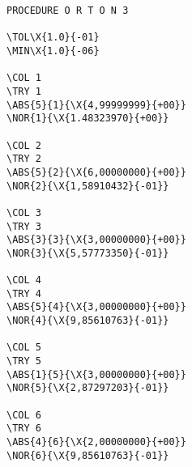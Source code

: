 


\small%
\begin{Verbatim}[commandchars=\\\{\},codes={\catcode`$=3\catcode`_=8}]
PROCEDURE O R T O N 3

\TOL\X{1.0}{-01}
\MIN\X{1.0}{-06}

\COL 1
\TRY 1
\ABS{5}{1}{\X{4,99999999}{+00}}
\NOR{1}{\X{1.48323970}{+00}}

\COL 2
\TRY 2
\ABS{5}{2}{\X{6,00000000}{+00}}
\NOR{2}{\X{1,58910432}{-01}}

\COL 3
\TRY 3
\ABS{3}{3}{\X{3,00000000}{+00}}
\NOR{3}{\X{5,57773350}{-01}}

\COL 4
\TRY 4
\ABS{5}{4}{\X{3,00000000}{+00}}
\NOR{4}{\X{9,85610763}{-01}}

\COL 5
\TRY 5
\ABS{1}{5}{\X{3,00000000}{+00}}
\NOR{5}{\X{2,87297203}{-01}}

\COL 6
\TRY 6
\ABS{4}{6}{\X{2,00000000}{+00}}
\NOR{6}{\X{9,85610763}{-01}}


\end{Verbatim}


\ABS{ }{ }{\X{ }{ }}
\NOR{ }{\X{}{}}

\fi

